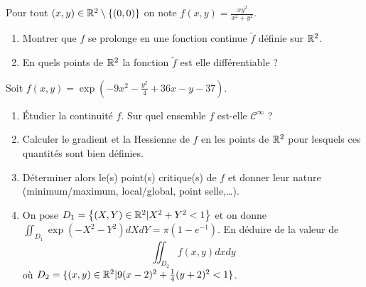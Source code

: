 \documentclass{article}
\begin{document}
\bigskip

\bigskip

\exo{}
Pour tout $(x,y) \in \mathbb{R}^2 \setminus \left\{ (0,0) \right\}$ on note $f(x,y) = \frac{xy^2}{x^2 + y^2}$.
\begin{enumerate}
	\item Montrer que $f$ se prolonge en une fonction continue $\tilde f$ définie sur $\mathbb{R}^2$.
	\item En quels points de $\mathbb{R}^2$ la fonction $\tilde f$ est elle différentiable ?
\end{enumerate}

\bigskip





\exo{} Soit $f(x,y) = \exp \left ( -9x^2 - \frac{y^2}{4} +36 x -y -37 \right)$.%
\begin{enumerate}
	\item \'Etudier la continuité $f$. Sur quel ensemble $f$ est-elle $\mathcal C^\infty$  ?
	\item Calculer le gradient et la Hessienne de $f$ en les points de $\mathbb{R}^2$ pour lesquels ces quantités sont bien définies.
	\item Déterminer alors le(s) point(s) critique(s) de $f$ et donner leur nature (minimum/maximum, local/global, point selle,\ldots).
	\item On pose $D_1=\left\{ (X,Y)\in\mathbb{R}^2 | X^2 + Y^2 < 1 \right\}$ et on donne $\iint_{D_1} \exp(-X^2 -Y^2 )dXdY  = \pi(1 - e^{-1})$.
En déduire de  la valeur de 
\[
\iint_{D_2} f(x,y) dxdy\] où $D_2 = \{ (x,y)\in\mathbb{R}^2 | 9(x-2)^2 + \frac {1}{4} (y+2)^2  < 1 \}$.
\end{enumerate}
\end{document}
